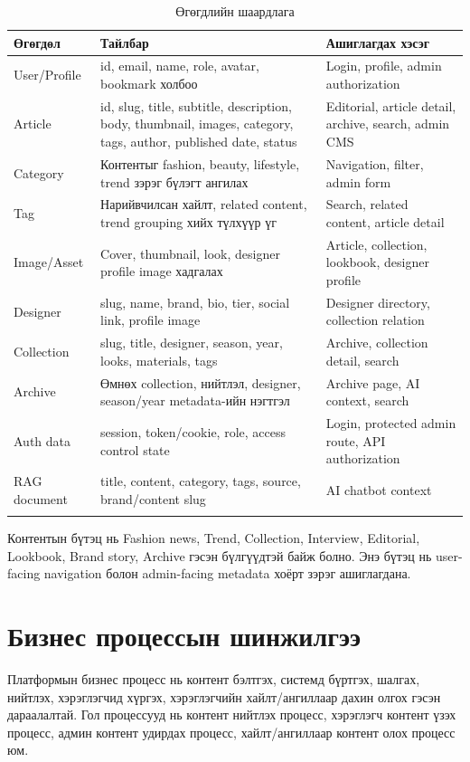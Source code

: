 \begin{longtable}{|L{0.18\textwidth}|L{0.38\textwidth}|L{0.30\textwidth}|}
  \hline
  \textbf{Өгөгдөл} & \textbf{Тайлбар} & \textbf{Ашиглагдах хэсэг} \\ \hline
  User/Profile & id, email, name, role, avatar, bookmark холбоо & Login, profile, admin authorization \\ \hline
  Article & id, slug, title, subtitle, description, body, thumbnail, images, category, tags, author, published date, status & Editorial, article detail, archive, search, admin CMS \\ \hline
  Category & Контентыг fashion, beauty, lifestyle, trend зэрэг бүлэгт ангилах & Navigation, filter, admin form \\ \hline
  Tag & Нарийвчилсан хайлт, related content, trend grouping хийх түлхүүр үг & Search, related content, article detail \\ \hline
  Image/Asset & Cover, thumbnail, look, designer profile image хадгалах & Article, collection, lookbook, designer profile \\ \hline
  Designer & slug, name, brand, bio, tier, social link, profile image & Designer directory, collection relation \\ \hline
  Collection & slug, title, designer, season, year, looks, materials, tags & Archive, collection detail, search \\ \hline
  Archive & Өмнөх collection, нийтлэл, designer, season/year metadata-ийн нэгтгэл & Archive page, AI context, search \\ \hline
  Auth data & session, token/cookie, role, access control state & Login, protected admin route, API authorization \\ \hline
  RAG document & title, content, category, tags, source, brand/content slug & AI chatbot context \\ \hline
  \caption{Өгөгдлийн шаардлага}
  \label{tab:data-requirements-ch2}\\
\end{longtable}

Контентын бүтэц нь Fashion news, Trend, Collection, Interview, Editorial, Lookbook, Brand story, Archive гэсэн бүлгүүдтэй байж болно. Энэ бүтэц нь user-facing navigation болон admin-facing metadata хоёрт зэрэг ашиглагдана.

\section{Бизнес процессын шинжилгээ}
Платформын бизнес процесс нь контент бэлтгэх, системд бүртгэх, шалгах, нийтлэх, хэрэглэгчид хүргэх, хэрэглэгчийн хайлт/ангиллаар дахин олгох гэсэн дараалалтай. Гол процессууд нь контент нийтлэх процесс, хэрэглэгч контент үзэх процесс, админ контент удирдах процесс, хайлт/ангиллаар контент олох процесс юм.

